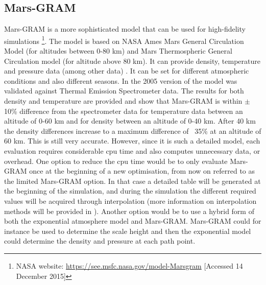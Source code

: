\subsection{Mars-\ac{GRAM}}
\label{subsec:marsgram}
Mars-\ac{GRAM} is a more sophisticated model that can be used for high-fidelity simulations \cite{justus2008utilizing}\footnote{NASA website: \url{https://see.msfc.nasa.gov/model-Marsgram} [Accessed 14 December 2015]}. The model is based on NASA Ames Mars General Circulation Model (for altitudes between 0-80 km) and Mars Thermospheric General Circulation model (for altitude above 80 km). It can provide density, temperature and pressure data (among other data) \cite{justus2005aerocapture}. It can be set for different atmospheric conditions and also different seasons. In \cite{justus2005aerocapture} the 2005 version of the model was validated against Thermal Emission Spectrometer data. The results for both density and temperature are provided and show that Mars-\ac{GRAM} is within $\pm$ 10\% difference from the spectrometer data for temperature data between an altitude of 0-60 km and for density between an altitude of 0-40 km. After 40 km the density differences increase to a maximum difference of ~35\% at an altitude of 60 km. This is still very accurate. However, since it is such a detailed model, each evaluation requires considerable cpu time and also computes unnecessary data, or overhead. One option to reduce the cpu time would be to only evaluate Mars-\ac{GRAM} once at the beginning of a new optimisation, from now on referred to as the limited Mars-\ac{GRAM} option. In that case a detailed table will be generated at the beginning of the simulation, and during the simulation the different required values will be acquired through interpolation (more information on interpolation methods will be provided in ). Another option would be to use a hybrid form of both the exponential atmosphere model and Mars-\ac{GRAM}. Mars-\ac{GRAM} could for instance be used to determine the scale height and then the exponential model could determine the density and pressure at each path point.



